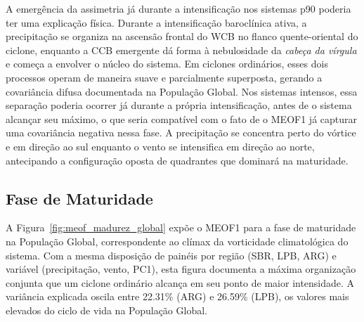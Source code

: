 A emergência da assimetria já durante a intensificação nos sistemas p90 poderia ter uma explicação física.
Durante a intensificação baroclínica ativa, a precipitação se organiza na ascensão frontal do WCB no flanco quente-oriental do ciclone, enquanto a CCB emergente dá forma à nebulosidade da \textit{cabeça da vírgula} \citep{browning1986conceptual} e começa a envolver o núcleo do sistema.
Em ciclones ordinários, esses dois processos operam de maneira suave e parcialmente superposta, gerando a covariância difusa documentada na População Global.
Nos sistemas intensos, essa separação poderia ocorrer já durante a própria intensificação, antes de o sistema alcançar seu máximo, o que seria compatível com o fato de o MEOF1 já capturar uma covariância negativa nessa fase. A precipitação se concentra perto do vórtice e em direção ao sul enquanto o vento se intensifica em direção ao norte, antecipando a configuração oposta de quadrantes que dominará na maturidade.

\subsection{Fase de Maturidade}
\label{subsec:meof_madurez}

A Figura~\ref{fig:meof_madurez_global} expõe o MEOF1 para a fase de maturidade na População Global, correspondente ao clímax da vorticidade climatológica do sistema.
Com a mesma disposição de painéis por região (SBR, LPB, ARG) e variável (precipitação, vento, PC1), esta figura documenta a máxima organização conjunta que um ciclone ordinário alcança em seu ponto de maior intensidade.
A variância explicada oscila entre 22.31\% (ARG) e 26.59\% (LPB), os valores mais elevados do ciclo de vida na População Global.

